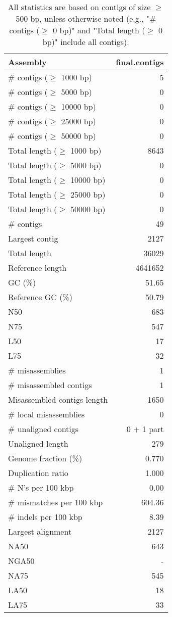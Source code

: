 \documentclass[12pt,a4paper]{article}
\begin{document}
\begin{table}[ht]
\begin{center}
\caption{All statistics are based on contigs of size $\geq$ 500 bp, unless otherwise noted (e.g., "\# contigs ($\geq$ 0 bp)" and "Total length ($\geq$ 0 bp)" include all contigs).}
\begin{tabular}{|l*{1}{|r}|}
\hline
Assembly & final.contigs \\ \hline
\# contigs ($\geq$ 1000 bp) & 5 \\ \hline
\# contigs ($\geq$ 5000 bp) & 0 \\ \hline
\# contigs ($\geq$ 10000 bp) & 0 \\ \hline
\# contigs ($\geq$ 25000 bp) & 0 \\ \hline
\# contigs ($\geq$ 50000 bp) & 0 \\ \hline
Total length ($\geq$ 1000 bp) & 8643 \\ \hline
Total length ($\geq$ 5000 bp) & 0 \\ \hline
Total length ($\geq$ 10000 bp) & 0 \\ \hline
Total length ($\geq$ 25000 bp) & 0 \\ \hline
Total length ($\geq$ 50000 bp) & 0 \\ \hline
\# contigs & 49 \\ \hline
Largest contig & 2127 \\ \hline
Total length & 36029 \\ \hline
Reference length & 4641652 \\ \hline
GC (\%) & 51.65 \\ \hline
Reference GC (\%) & 50.79 \\ \hline
N50 & 683 \\ \hline
N75 & 547 \\ \hline
L50 & 17 \\ \hline
L75 & 32 \\ \hline
\# misassemblies & 1 \\ \hline
\# misassembled contigs & 1 \\ \hline
Misassembled contigs length & 1650 \\ \hline
\# local misassemblies & 0 \\ \hline
\# unaligned contigs & 0 + 1 part \\ \hline
Unaligned length & 279 \\ \hline
Genome fraction (\%) & 0.770 \\ \hline
Duplication ratio & 1.000 \\ \hline
\# N's per 100 kbp & 0.00 \\ \hline
\# mismatches per 100 kbp & 604.36 \\ \hline
\# indels per 100 kbp & 8.39 \\ \hline
Largest alignment & 2127 \\ \hline
NA50 & 643 \\ \hline
NGA50 & - \\ \hline
NA75 & 545 \\ \hline
LA50 & 18 \\ \hline
LA75 & 33 \\ \hline
\end{tabular}
\end{center}
\end{table}
\end{document}

